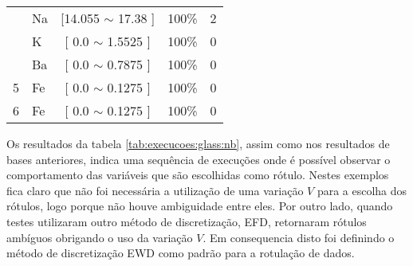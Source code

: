 \begin{table}[!h]
\begin{tabular}{llcrc}
                                            & Na    & [14.055 $\sim$ 17.38  ]           & 100\%                             & 2 \\
                                            & K     & [ 0.0 $\sim$  1.5525      ]       & 100\%                               & 0 \\  
                                            & Ba    & [ 0.0 $\sim$  0.7875     ]       & 100\%                               & 0 \\   
\multirow{-4}{*}{5}                          & Fe    & [ 0.0 $\sim$  0.1275     ]       & 100\%                               & 0 \\  \hline
6                                            & Fe    & [ 0.0 $\sim$  0.1275     ]       & 100\%                               & 0\\  \hline

\hline

\end{tabular}
\end{table}

Os resultados da tabela \ref{tab:execucoes:glass:nb}, assim como nos resultados de bases anteriores, indica uma sequência de execuções onde é possível observar o comportamento das variáveis que são escolhidas como rótulo. Nestes exemplos fica claro que não foi necessária a utilização de uma variação ${V}$ para a escolha dos rótulos, logo porque não houve ambiguidade entre eles. Por outro lado, quando testes utilizaram outro método de discretização, EFD, retornaram rótulos ambíguos obrigando o uso da variação ${V}$. Em consequencia disto foi definindo o método de discretização EWD como padrão para a rotulação de dados.



